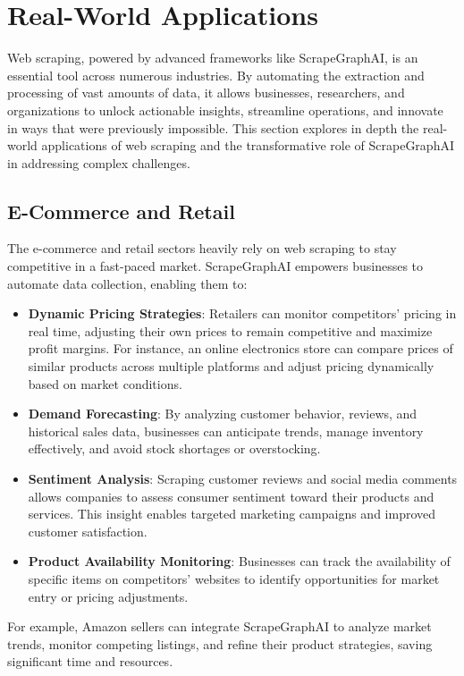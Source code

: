\section{Real-World Applications}

Web scraping, powered by advanced frameworks like ScrapeGraphAI, is an essential tool across numerous industries. By automating the extraction and processing of vast amounts of data, it allows businesses, researchers, and organizations to unlock actionable insights, streamline operations, and innovate in ways that were previously impossible. This section explores in depth the real-world applications of web scraping and the transformative role of ScrapeGraphAI in addressing complex challenges.

\subsection{E-Commerce and Retail}
The e-commerce and retail sectors heavily rely on web scraping to stay competitive in a fast-paced market. ScrapeGraphAI empowers businesses to automate data collection, enabling them to:
\begin{itemize}
    \item \textbf{Dynamic Pricing Strategies}: Retailers can monitor competitors’ pricing in real time, adjusting their own prices to remain competitive and maximize profit margins. For instance, an online electronics store can compare prices of similar products across multiple platforms and adjust pricing dynamically based on market conditions.
    \item \textbf{Demand Forecasting}: By analyzing customer behavior, reviews, and historical sales data, businesses can anticipate trends, manage inventory effectively, and avoid stock shortages or overstocking.
    \item \textbf{Sentiment Analysis}: Scraping customer reviews and social media comments allows companies to assess consumer sentiment toward their products and services. This insight enables targeted marketing campaigns and improved customer satisfaction.
    \item \textbf{Product Availability Monitoring}: Businesses can track the availability of specific items on competitors’ websites to identify opportunities for market entry or pricing adjustments.
\end{itemize}
For example, Amazon sellers can integrate ScrapeGraphAI to analyze market trends, monitor competing listings, and refine their product strategies, saving significant time and resources.

